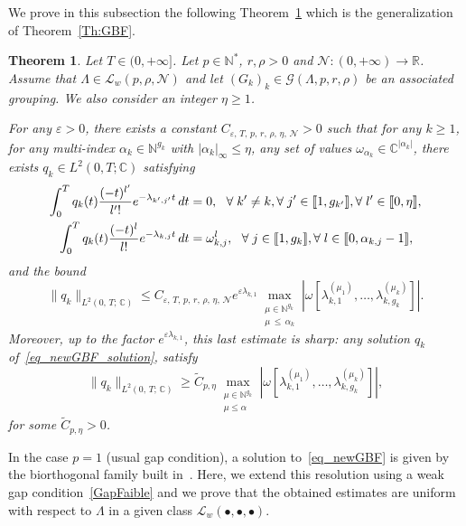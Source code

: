 \documentclass[11pt]{article}
\newtheorem{theo}{Theorem}[section]
\theoremstyle{definition}
\numberwithin{equation}{section}
\numberwithin{figure}{section}
\numberwithin{table}{section}
\newcommand{\llbracket}{\mathopen{[\mkern -2.7mu[}}
\newcommand{\rrbracket}{\mathclose{]\mkern -2.7mu]}}
\newcommand{\inter}[2]{\llbracket #1,#2 \rrbracket}
\newcommand{\n}{g}
\newcommand{\LL}{\mathcal{L}}
\newcommand{\NN}{\mathcal{N}}
\newcommand{\N}{\mathbb{N}}
\newcommand{\R}{\mathbb{R}}
\newcommand{\C}{\mathbb{C}}
\renewcommand{\cdot}{{\scriptstyle \bullet}}
\let\oldforall\forall
\renewcommand*{\forall}{\mathrel{\oldforall}}
\begin{document}
We prove in this subsection the following Theorem~\ref{Th:newGBF} which is the generalization of Theorem~\ref{Th:GBF}.
\begin{theo} \label{Th:newGBF}
Let $T \in (0,+\infty]$. Let $p \in \N^*$, $r, \rho > 0$ and $\NN : (0,+\infty) \to \R$. Assume that $\Lambda \in \LL_w(p,\rho, \NN)$ and let $(G_k)_k\in \mathcal{G}(\Lambda,p,r,\rho)$ be an associated grouping. We also consider an integer $\eta\geq 1$.

For any $\varepsilon > 0$, there exists a constant $C_{\varepsilon,\, T,\, p,\, r,\, \rho,\, \eta,\, \NN} >0$ such that for any $k \geq 1$, for any multi-index $\alpha_k\in \N^{\n_k}$ with $|\alpha_k|_\infty\leq \eta$, any set of values $\omega_{\alpha_k} \in \C^{|\alpha_k|}$, there exists $q_k \in L^2(0,T; \C)$ satisfying
\begin{subequations}\label{eq_newGBF}
\begin{align}
\int_0^{T} q_k(t) \frac{(-t)^{l'}}{l'!} e^{-\lambda_{k',j'}t} \, dt & = 0, \ \ \forall k'\neq k, \forall j'\in \inter{1}{\n_{k'}}, \forall l'\in \inter{0}{\eta}, \label{eq_newGBF_orthogonalite}
\\
\int_0^{T} q_k(t) \frac{(-t)^l}{l!} e^{-\lambda_{k,j}t} \, dt & = \omega_{k,j}^l, \ \ \forall j\in \inter{1}{\n_{k}}, \forall l\in \inter{0}{\alpha_{k,j}-1}, \label{eq_newGBF_solution}
\end{align}
\end{subequations}
and the bound
\begin{equation}\label{bound_qk_multiplicities}
\|q_k\|_{L^2(0,\,T;\,\C)}\leq C_{\varepsilon,\, T,\, p,\, r,\, \rho,\, \eta,\, \NN} e^{\varepsilon \lambda_{k,1}} \max\limits_{\substack{\mu\in \N^{\n_k} \\ \mu\,\leq\,\alpha_k}} \left| \omega[\lambda_{k,1}^{(\mu_1)},\dotsc,\lambda_{k,\n_k}^{(\mu_k)}] \right|.
\end{equation}
Moreover, up to the factor $e^{\varepsilon \lambda_{k,1}}$, this last estimate is sharp: any solution $q_k$ of~\eqref{eq_newGBF_solution}, satisfy
\begin{equation}\label{lower_bound_qk_multiplicities}
\|q_k\|_{L^2(0,\,T;\,\C)} \geq \widetilde{C}_{p, \eta} \max\limits_{\substack{\mu\in \N^{\n_k} \\ \mu\leq \alpha}} \left| \omega[\lambda_{k,1}^{(\mu_1)},\dotsc,\lambda_{k,\n_k}^{(\mu_k)}] \right|,
\end{equation}
for some $\widetilde{C}_{p, \eta}>0$.
\end{theo}

In the case $p=1$ (usual gap condition), a solution to~\eqref{eq_newGBF} is given by the biorthogonal family built in~\cite{AKBGBDT_Kalman}. Here, we extend this resolution using a weak gap condition~\eqref{GapFaible} and we prove that the obtained estimates are uniform with respect to $\Lambda$ in a given class $\LL_w(\cdot, \cdot, \cdot)$.
\end{document}
